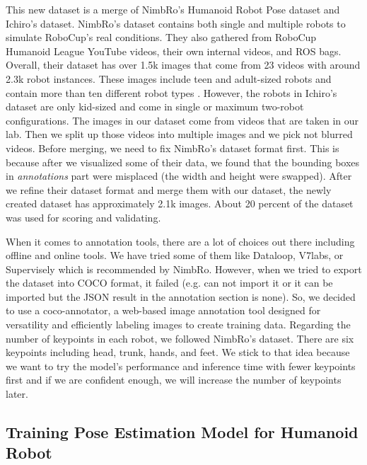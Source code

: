 This new dataset is a merge of NimbRo's Humanoid Robot Pose dataset and Ichiro's dataset. NimbRo's dataset contains both single and multiple robots to
simulate RoboCup's real conditions. They also gathered from RoboCup Humanoid League YouTube videos, their own internal videos, and ROS bags. 
Overall, their dataset has over 1.5k images that come from 23 videos with around 2.3k robot instances. These images include teen and adult-sized robots and contain more than ten different robot types \parencite{amini2021}.
However, the robots in Ichiro's dataset are only kid-sized and come in single or maximum two-robot configurations. The images in our dataset come from videos that are taken in our lab. 
Then we split up those videos into multiple images and we pick not blurred videos.
Before merging, we need to fix NimbRo's dataset format first. This is because after we visualized some of their data, we found that the bounding boxes in \emph{annotations} part were misplaced (the width and height were swapped).
After we refine their dataset format and merge them with our dataset, the newly created dataset has approximately 2.1k images.
About 20 percent of the dataset was used for scoring and validating.

When it comes to annotation tools, there are a lot of choices out there including offline and online tools. We have tried some of them like Dataloop, V7labs, or Supervisely which is recommended by NimbRo.
However, when we tried to export the dataset into COCO format, it failed (e.g. can not import it or it can be imported but the JSON result in the annotation section is none). So, we decided to use a coco-annotator,
a web-based image annotation tool designed for versatility and efficiently labeling images to create training data. Regarding the number of keypoints in each robot, we followed NimbRo's dataset.
There are six keypoints including head, trunk, hands, and feet. We stick to that idea because we want to try the model's performance and inference time with fewer keypoints first and if we are confident enough, we will increase the number of keypoints later.

\subsection{Training Pose Estimation Model for Humanoid Robot}
\label{subsec:training-robot}

